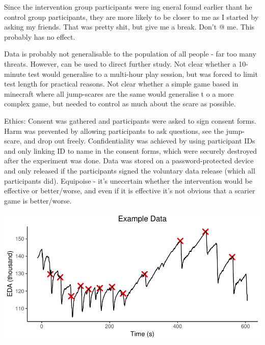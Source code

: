\documentclass[12pt,a4paper]{article}\usepackage[]{graphicx}\usepackage[]{color}
\makeatletter
\def\maxwidth{ %
  \ifdim\Gin@nat@width>\linewidth
    \linewidth
  \else
    \Gin@nat@width
  \fi
}
\newenvironment{knitrout}{}{} %
\makeatother
\begin{document}
Since the intervention group participants were ing eneral found earlier thant he control group participants, they are more likely to be closer to me as I started by asking my friends. That was pretty shit, but give me a break. Don't @ me. This probably has no effect.

Data is probably not generalisable to the population of all people - far too many threats. However, can be used to direct further study.
Not clear whether a 10-minute test would generalise to a multi-hour play session, but was forced to limit test length for practical reasons.
Not clear whether a simple game based in minecraft where all jump-scares are the same would generalise t o a more complex game, but needed to control as much about the scare as possible.

Ethics:
Consent was gathered and participants were asked to sign consent forms.
Harm was prevented by allowing participants to ask questions, see the jump-scare, and drop out freely.
Confidentiality was achieved by using participant IDs and only linking ID to name in the consent forms, which were securely destroyed after the experiment was done. Data was stored on a password-protected device and only released if the participants signed the voluntary data release (which all participants did).
Equipoise - it's unecertain whether the intervention would be effective or better/worse, and even if it is effective it's not obvious that a scarier game is better/worse.


\begin{knitrout}
\color{fgcolor}

{\centering \includegraphics[width=\maxwidth]{figure/ExampleEDA-1} 

}



\end{knitrout}
\end{document}
